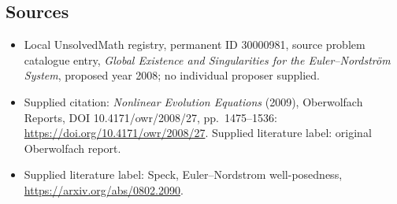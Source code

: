 \documentclass[11pt]{article}
\begin{document}
\subsection{Sources}
\begin{itemize}\item Local UnsolvedMath registry, permanent ID 30000981, source problem catalogue entry, \emph{Global Existence and Singularities for the Euler--Nordstr\"om System}, proposed year 2008; no individual proposer supplied.\item Supplied citation: \emph{Nonlinear Evolution Equations} (2009), Oberwolfach Reports, DOI 10.4171/owr/2008/27, pp.\ 1475--1536: \url{https://doi.org/10.4171/owr/2008/27}. Supplied literature label: original Oberwolfach report.\item Supplied literature label: Speck, Euler--Nordstrom well-posedness, \url{https://arxiv.org/abs/0802.2090}.\end{itemize}
\end{document}
